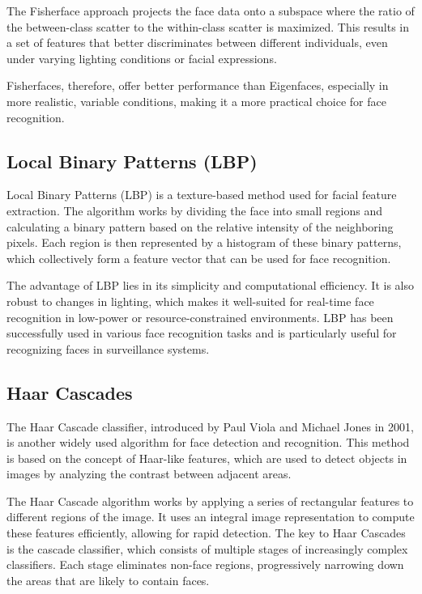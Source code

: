 The Fisherface approach projects the face data onto a subspace where the ratio of the between-class scatter to the within-class scatter is maximized. This results in a set of features that better discriminates between different individuals, even under varying lighting conditions or facial expressions.

Fisherfaces, therefore, offer better performance than Eigenfaces, especially in more realistic, variable conditions, making it a more practical choice for face recognition.

\subsection{Local Binary Patterns (LBP)}
Local Binary Patterns (LBP) is a texture-based method used for facial feature extraction. The algorithm works by dividing the face into small regions and calculating a binary pattern based on the relative intensity of the neighboring pixels. Each region is then represented by a histogram of these binary patterns, which collectively form a feature vector that can be used for face recognition.

The advantage of LBP lies in its simplicity and computational efficiency. It is also robust to changes in lighting, which makes it well-suited for real-time face recognition in low-power or resource-constrained environments. LBP has been successfully used in various face recognition tasks and is particularly useful for recognizing faces in surveillance systems.

\subsection{Haar Cascades}
The Haar Cascade classifier, introduced by Paul Viola and Michael Jones in 2001, is another widely used algorithm for face detection and recognition. This method is based on the concept of Haar-like features, which are used to detect objects in images by analyzing the contrast between adjacent areas.

The Haar Cascade algorithm works by applying a series of rectangular features to different regions of the image. It uses an integral image representation to compute these features efficiently, allowing for rapid detection. The key to Haar Cascades is the cascade classifier, which consists of multiple stages of increasingly complex classifiers. Each stage eliminates non-face regions, progressively narrowing down the areas that are likely to contain faces.

